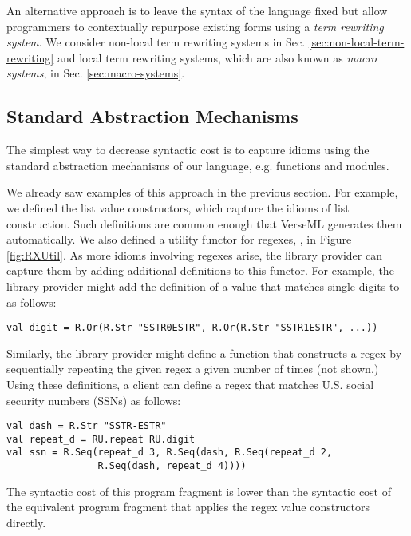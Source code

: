 An alternative approach is to leave the syntax of the language fixed but allow programmers to contextually repurpose existing forms using a \emph{term rewriting system}. We consider {non-local term rewriting systems} in Sec. \ref{sec:non-local-term-rewriting} and {local term rewriting systems}, which are also known as \emph{macro systems}, in Sec. \ref{sec:macro-systems}.





\subsection{Standard Abstraction Mechanisms}\label{sec:standard-abstraction-mechanisms}
The simplest way to decrease syntactic cost is to capture idioms using the standard abstraction mechanisms of our 
language, e.g. functions and modules. 

We already saw examples of this approach in the previous section. For example, we defined the list value constructors, which capture the idioms of list construction. Such definitions are common enough that VerseML generates them automatically. 
We also defined a utility functor for regexes, , in Figure \ref{fig:RXUtil}. As more idioms involving regexes arise, the library provider can capture them by adding additional definitions to this functor. For example, the library provider might add the definition of a value that matches single digits to  as follows:
\begin{lstlisting}[numbers=none]
val digit = R.Or(R.Str "SSTR0ESTR", R.Or(R.Str "SSTR1ESTR", ...))
\end{lstlisting}
Similarly, the library provider might define a function  that constructs a regex by sequentially repeating the given regex a given number of times (not shown.) 
Using these definitions, a client can define a regex that matches U.S. social security numbers (SSNs) as follows:
\begin{lstlisting}[numbers=none]
val dash = R.Str "SSTR-ESTR"
val repeat_d = RU.repeat RU.digit
val ssn = R.Seq(repeat_d 3, R.Seq(dash, R.Seq(repeat_d 2, 
                R.Seq(dash, repeat_d 4))))
\end{lstlisting}
The syntactic cost of this program fragment is lower than the syntactic cost of the equivalent program fragment that applies  the regex value constructors directly. 

